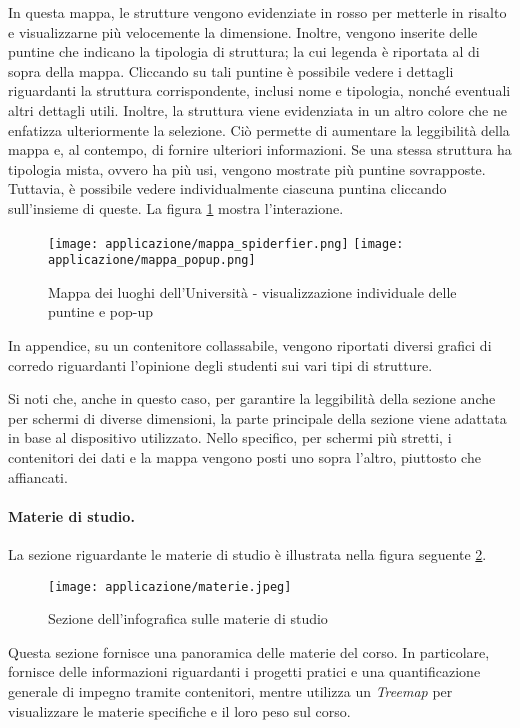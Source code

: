 In questa mappa, le strutture vengono evidenziate in rosso per metterle in risalto e visualizzarne più velocemente la dimensione.
Inoltre, vengono inserite delle puntine che indicano la tipologia di struttura; la cui legenda è riportata al di sopra della mappa.
Cliccando su tali puntine è possibile vedere i dettagli riguardanti la struttura corrispondente, inclusi nome e tipologia, nonché eventuali altri dettagli utili. 
Inoltre, la struttura viene evidenziata in un altro colore che ne enfatizza ulteriormente la selezione.
Ciò permette di aumentare la leggibilità della mappa e, al contempo, di fornire ulteriori informazioni.
Se una stessa struttura ha tipologia mista, ovvero ha più usi, vengono mostrate più puntine sovrapposte. Tuttavia, è possibile vedere individualmente ciascuna puntina 
cliccando sull'insieme di queste.
La figura \ref{fig:app_mappa_interazione} mostra l'interazione.
\begin{figure}[H] 
    \centering 
    \texttt{[image: applicazione/mappa\_spiderfier.png]} 
    \texttt{[image: applicazione/mappa\_popup.png]} 
    \caption{Mappa dei luoghi dell'Università - visualizzazione individuale delle puntine e pop-up}
    \label{fig:app_mappa_interazione}
\end{figure}

In appendice, su un contenitore collassabile, vengono riportati diversi grafici di corredo riguardanti l'opinione degli studenti sui vari tipi di strutture.

\bigskip
\noindent Si noti che, anche in questo caso, per garantire la leggibilità della sezione anche per schermi di diverse dimensioni, la parte principale della sezione viene adattata 
in base al dispositivo utilizzato. Nello specifico, per schermi più stretti, i contenitori dei dati e la mappa vengono posti uno sopra l'altro, piuttosto che affiancati.

\paragraph{Materie di studio.} La sezione riguardante le materie di studio è illustrata nella figura seguente \ref{fig:app_materie}. 
\begin{figure}[H] 
    \centering 
    \texttt{[image: applicazione/materie.jpeg]} 
    \caption{Sezione dell'infografica sulle materie di studio}
    \label{fig:app_materie}
\end{figure}
\noindent Questa sezione fornisce una panoramica delle materie del corso. In particolare, fornisce delle informazioni riguardanti i progetti pratici e una quantificazione generale di impegno 
tramite contenitori, mentre utilizza un \emph{Treemap} per visualizzare le materie specifiche e il loro peso sul corso.

